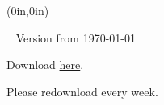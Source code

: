 \documentclass[openany,oneside]{memoir}
\begin{document}
\thispagestyle{empty}
\begin{textblock*}{0in}(0in,0in)
  \noindent\hfill
  \begin{minipage}[b][\stockheight][s]{.9\stockwidth}
  \end{minipage}
  \hspace*{1cm}
\end{textblock*}
\
    \vfill
    \noindent Version from \today\par
    \noindent Download \href{https://github.com/catrincm/forallx-bris/raw/master/forallxbris.pdf}{here}. \par 
    \noindent Please redownload every week.\par
\newpage\color{black}





\midsloppy





\end{document}
